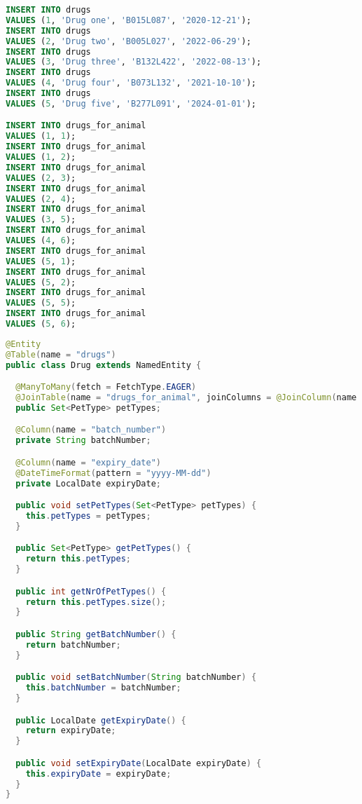 \documentclass[12pt, a4paper]{article}
\begin{document}
\begin{lstlisting}[language=SQL, title='data.sql']
INSERT INTO drugs
VALUES (1, 'Drug one', 'B015L087', '2020-12-21');
INSERT INTO drugs
VALUES (2, 'Drug two', 'B005L027', '2022-06-29');
INSERT INTO drugs
VALUES (3, 'Drug three', 'B132L422', '2022-08-13');
INSERT INTO drugs
VALUES (4, 'Drug four', 'B073L132', '2021-10-10');
INSERT INTO drugs
VALUES (5, 'Drug five', 'B277L091', '2024-01-01');

INSERT INTO drugs_for_animal
VALUES (1, 1);
INSERT INTO drugs_for_animal
VALUES (1, 2);
INSERT INTO drugs_for_animal
VALUES (2, 3);
INSERT INTO drugs_for_animal
VALUES (2, 4);
INSERT INTO drugs_for_animal
VALUES (3, 5);
INSERT INTO drugs_for_animal
VALUES (4, 6);
INSERT INTO drugs_for_animal
VALUES (5, 1);
INSERT INTO drugs_for_animal
VALUES (5, 2);
INSERT INTO drugs_for_animal
VALUES (5, 5);
INSERT INTO drugs_for_animal
VALUES (5, 6);
\end{lstlisting}

\begin{lstlisting}[language=Java, title='Drug.java']
@Entity
@Table(name = "drugs")
public class Drug extends NamedEntity {

  @ManyToMany(fetch = FetchType.EAGER)
  @JoinTable(name = "drugs_for_animal", joinColumns = @JoinColumn(name = "drug_id"), inverseJoinColumns = @JoinColumn(name = "animal_type_id"))
  public Set<PetType> petTypes;

  @Column(name = "batch_number")
  private String batchNumber;

  @Column(name = "expiry_date")
  @DateTimeFormat(pattern = "yyyy-MM-dd")
  private LocalDate expiryDate;

  public void setPetTypes(Set<PetType> petTypes) {
    this.petTypes = petTypes;
  }

  public Set<PetType> getPetTypes() {
    return this.petTypes;
  }

  public int getNrOfPetTypes() {
    return this.petTypes.size();
  }

  public String getBatchNumber() {
    return batchNumber;
  }

  public void setBatchNumber(String batchNumber) {
    this.batchNumber = batchNumber;
  }

  public LocalDate getExpiryDate() {
    return expiryDate;
  }

  public void setExpiryDate(LocalDate expiryDate) {
    this.expiryDate = expiryDate;
  }
}
\end{lstlisting}
\end{document}
